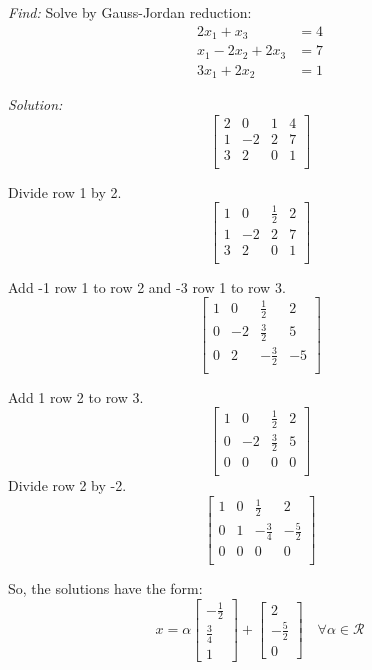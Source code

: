 \documentclass[11pt]{homework}
\begin{document}
\question
\emph{Find:}
\newline
Solve by Gauss-Jordan reduction:
\begin{align*}
2 x_1 +  x_3 &= 4 \\
x_1 - 2 x_2 + 2 x_3 &= 7 \\
3 x_1 + 2 x_2  &= 1 
\end{align*}

\noindent
\emph{Solution:}
\newline
\[
\left[
  \begin{array}{ccc|c}
  2 & 0 & 1 & 4  \\
  1 & -2 & 2 & 7 \\
  3 & 2 & 0 & 1 \\
  \end{array}
\right]
\]

Divide row 1 by 2.
\[
\left[
  \begin{array}{ccc|c}
  1 & 0 & \frac{1}{2} & 2  \\
  1 & -2 & 2 & 7 \\
  3 & 2 & 0 & 1 \\
  \end{array}
\right]
\]

Add -1 row 1 to row 2 and -3 row 1 to row 3.
\[
\left[
  \begin{array}{ccc|c}
  1 & 0  & \frac{1}{2} &  2 \\
  0 & -2 & \frac{3}{2} &  5 \\
  0 & 2 & -\frac{3}{2} & -5 \\
  \end{array}
\right]
\]

Add 1 row 2 to row 3.
\[
\left[
  \begin{array}{ccc|c}
  1 & 0  & \frac{1}{2} &  2 \\
  0 & -2 & \frac{3}{2} &  5 \\
  0 & 0 & 0 & 0 \\
  \end{array}
\right]
\]
Divide row 2 by -2.
\[
\left[
  \begin{array}{ccc|c}
  1 & 0 & \frac{1}{2} &  2 \\
  0 & 1 & -\frac{3}{4} & -\frac{5}{2} \\
  0 & 0 & 0 & 0 \\
  \end{array}
\right]
\]

So, the solutions have the form:
\begin{equation*}
x = \alpha
  \begin{bmatrix}
    -\frac{1}{2} \\
     \frac{3}{4} \\
     1
  \end{bmatrix}
  +
  \begin{bmatrix}
  2 \\
  -\frac{5}{2} \\
  0
  \end{bmatrix}
\quad \forall \alpha \in \mathcal{R}
\end{equation*}
 
\end{document}
